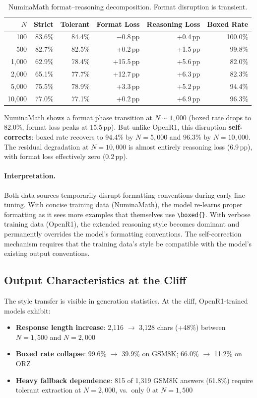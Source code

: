 \documentclass{article}
\begin{document}
\begin{table}[h]
\centering
\caption{NuminaMath format--reasoning decomposition. Format disruption is transient.}
\label{tab:decomp-nm}
\small
\begin{tabular}{@{}rrrrrr@{}}
\toprule
$N$ & Strict & Tolerant & Format Loss & Reasoning Loss & Boxed Rate \\
\midrule
100 & 83.6\% & 84.4\% & $-$0.8\,pp & +0.4\,pp & 100.0\% \\
500 & 82.7\% & 82.5\% & +0.2\,pp & +1.5\,pp & 99.8\% \\
1,000 & 62.9\% & 78.4\% & +15.5\,pp & +5.6\,pp & 82.0\% \\
2,000 & 65.1\% & 77.7\% & +12.7\,pp & +6.3\,pp & 82.3\% \\
5,000 & 75.5\% & 78.9\% & +3.3\,pp & +5.2\,pp & 94.4\% \\
10,000 & 77.0\% & 77.1\% & +0.2\,pp & +6.9\,pp & 96.3\% \\
\bottomrule
\end{tabular}
\end{table}

NuminaMath shows a format phase transition at $N{\sim}1{,}000$ (boxed rate drops to 82.0\%, format loss peaks at 15.5\,pp). But unlike OpenR1, this disruption \textbf{self-corrects}: boxed rate recovers to 94.4\% by $N{=}5{,}000$ and 96.3\% by $N{=}10{,}000$. The residual degradation at $N{=}10{,}000$ is almost entirely reasoning loss (6.9\,pp), with format loss effectively zero (0.2\,pp).

\paragraph{Interpretation.} Both data sources temporarily disrupt formatting conventions during early fine-tuning. With concise training data (NuminaMath), the model re-learns proper formatting as it sees more examples that themselves use \texttt{\textbackslash boxed\{\}}. With verbose training data (OpenR1), the extended reasoning style becomes dominant and permanently overrides the model's formatting conventions. The self-correction mechanism requires that the training data's style be compatible with the model's existing output conventions.

\subsection{Output Characteristics at the Cliff}

The style transfer is visible in generation statistics. At the cliff, OpenR1-trained models exhibit:
\begin{itemize}
    \item \textbf{Response length increase}: 2,116 $\to$ 3,128 chars (+48\%) between $N{=}1{,}500$ and $N{=}2{,}000$
    \item \textbf{Boxed rate collapse}: 99.6\% $\to$ 39.9\% on GSM8K; 66.0\% $\to$ 11.2\% on ORZ
    \item \textbf{Heavy fallback dependence}: 815 of 1,319 GSM8K answers (61.8\%) require tolerant extraction at $N{=}2{,}000$, vs.\ only 0 at $N{=}1{,}500$
\end{itemize}
\end{document}

